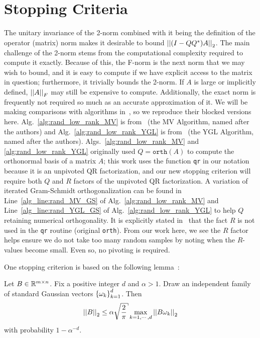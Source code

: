 \section{Stopping Criteria}
\label{sec:rand_stop_crit}

The unitary invariance of the 2-norm combined with it being
the definition of the operator (matrix) norm makes it
desirable to bound $\left| \left| (I-QQ^{*})A \right| \right|_{2}$.
The main challenge of the 2-norm stems from the computational
complexity required to compute it exactly.
Because of this, the F-norm is the next norm that we may wish
to bound, and it is easy to compute if we have explicit access to the matrix
in question; furthermore, it trivially bounds the 2-norm.
If $A$ is large or implicitly defined, $\left| \left| A \right| \right|_{F}$ may still be expensive
to compute.
Additionally, the exact norm is frequently not required so much as
an accurate approximation of it.
We will be making comparisons with algorithms
in~\cite{martinsson2016randomized,yu2018efficient}, so we reproduce
their blocked versions here.
Alg.~\ref{alg:rand_low_rank_MV}
is from~\cite[Figure 2]{martinsson2016randomized} (the MV Algorithm,
named after the authors)
and Alg.~\ref{alg:rand_low_rank_YGL}
is from~\cite[Algorithm 2]{yu2018efficient} (the YGL Algorithm,
named after the authors).
Algs.~\ref{alg:rand_low_rank_MV} and \ref{alg:rand_low_rank_YGL} originally
used $Q = \texttt{orth}(A)$ to compute the orthonormal basis
of a matrix $A$; this work uses the function \texttt{qr} in our notation
because it is an unpivoted QR factorization,
and our new stopping criterion will require both $Q$ and $R$ factors
of the unpivoted QR factorization.
A variation of iterated Gram-Schmidt orthogonalization can be found in
Line~\ref{alg_line:rand_MV_GS}  of Alg.~\ref{alg:rand_low_rank_MV}  and
Line~\ref{alg_line:rand_YGL_GS} of Alg.~\ref{alg:rand_low_rank_YGL}
to help $Q$ retaining numerical orthogonality.
It is explicitly stated in~\cite[Remark 5]{martinsson2016randomized}
that the fact $R$ is not used in the \texttt{qr} routine
(original \texttt{orth}).
From our work here, we see the $R$ factor helps ensure we do
not take too many random samples by noting when the $R$-values become small.
Even so, no pivoting is required.





One stopping criterion is based on the following lemma~\cite{RandomReview2011}:

\begin{lem}
\label{thm:rand_hmt_bound}
Let $B\in\mathbb{R}^{m\times n}$. Fix a positive integer $d$ and $\alpha>1$.
Draw an independent family of standard Gaussian vectors
$\left\{ \omega_{k} \right\}_{k=1}^{d}$.
Then
%
\begin{equation}
    \norm{B}_{2} \le \alpha\sqrt{\frac{2}{\pi}}\max_{k=1,\cdots,d}
        \norm{B\omega_{k}}_{2}
    \label{eq:rand_hmt_bound}
\end{equation}
%
with probability $1-\alpha^{-d}$.
\end{lem}

